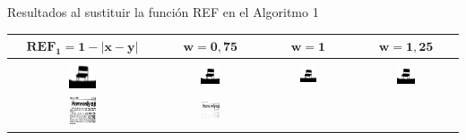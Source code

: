 \documentclass{beamer}
\theoremstyle{plain} %
\theoremstyle{definition}
\newcommand{\abs}[1]{\left\vert#1\right\vert}
\newcommand{\bb}{\bfseries}
\begin{document}
\begin{frame}{Resultados al sustituir la función REF en el Algoritmo 1}
  \begin{table}
  \centering
  \begin{tabular}{c||c|c|c}
  $\mathbf{REF_1=1-\abs{x-y}}$ & $\mathbf{w=0,75}$ &\bb $\mathbf{w=1}$ &\bb $\mathbf{w=1,25}$\\\hline\hline
  \includegraphics[width=0.2\textwidth]{img/res/e1a/alg1tipo1-chair.jpg} &
  \includegraphics[width=0.2\textwidth]{img/res/e1a/alg1tipo6-chair.jpg} &
  \includegraphics[width=0.2\textwidth]{img/res/e1a/alg1tipo6d0.75-chair.jpg} &
  \includegraphics[width=0.2\textwidth]{img/res/e1a/alg1tipo6d1.25-chair.jpg} \\
  \includegraphics[width=0.2\textwidth]{img/res/e1a/alg1tipo1-09.jpg} &
  \includegraphics[width=0.2\textwidth]{img/res/e1a/alg1tipo6-09.jpg} &

\end{tabular}
\end{table}
\end{frame}
\end{document}
